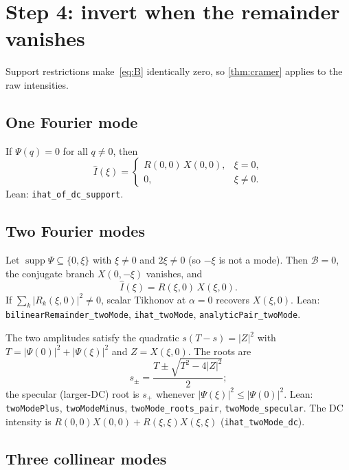 \documentclass[11pt,a4paper]{article}
\theoremstyle{definition}
\theoremstyle{remark}
\newcommand{\abs}[1]{\lvert#1\rvert}
\begin{document}
\section{Step 4: invert when the remainder vanishes}
\label{sec:small}

Support restrictions make~\eqref{eq:B} identically zero, so
\cref{thm:cramer} applies to the raw intensities.

\subsection{One Fourier mode}
\label{sec:onemode}

If $\Psi(q)=0$ for all $q\neq 0$, then
\begin{equation}
\hat I(\xi)
=
\begin{cases}
R(0,0)\,X(0,0), & \xi=0,\\
0, & \xi\neq 0.
\end{cases}
\end{equation}
Lean: \texttt{ihat\_of\_dc\_support}.

\subsection{Two Fourier modes}
\label{sec:twomode}

Let $\operatorname{supp}\Psi\subseteq\{0,\xi\}$ with $\xi\neq 0$ and
$2\xi\neq 0$ (so $-\xi$ is not a mode).
Then $\mathcal{B}=0$, the conjugate branch $X(0,-\xi)$ vanishes, and
\begin{equation}
\label{eq:twomode}
\hat I(\xi)=R(\xi,0)\,X(\xi,0).
\end{equation}
If $\sum_k\abs{R_k(\xi,0)}^2\neq 0$, scalar Tikhonov at $\alpha=0$
recovers $X(\xi,0)$.
Lean: \texttt{bilinearRemainder\_twoMode}, \texttt{ihat\_twoMode},
\texttt{analyticPair\_twoMode}.

The two amplitudes satisfy the quadratic
$s(T-s)=\abs{Z}^2$ with
$T=\abs{\Psi(0)}^2+\abs{\Psi(\xi)}^2$ and $Z=X(\xi,0)$.
The roots are
\begin{equation}
\label{eq:quad}
s_\pm
=\frac{T\pm\sqrt{T^2-4\abs{Z}^2}}{2};
\end{equation}
the specular (larger-DC) root is $s_+$ whenever
$\abs{\Psi(\xi)}^2\le\abs{\Psi(0)}^2$.
Lean: \texttt{twoModePlus}, \texttt{twoModeMinus},
\texttt{twoMode\_roots\_pair}, \texttt{twoMode\_specular}.
The DC intensity is
$R(0,0)X(0,0)+R(\xi,\xi)X(\xi,\xi)$
(\texttt{ihat\_twoMode\_dc}).

\subsection{Three collinear modes}
\label{sec:threemode}
\end{document}
